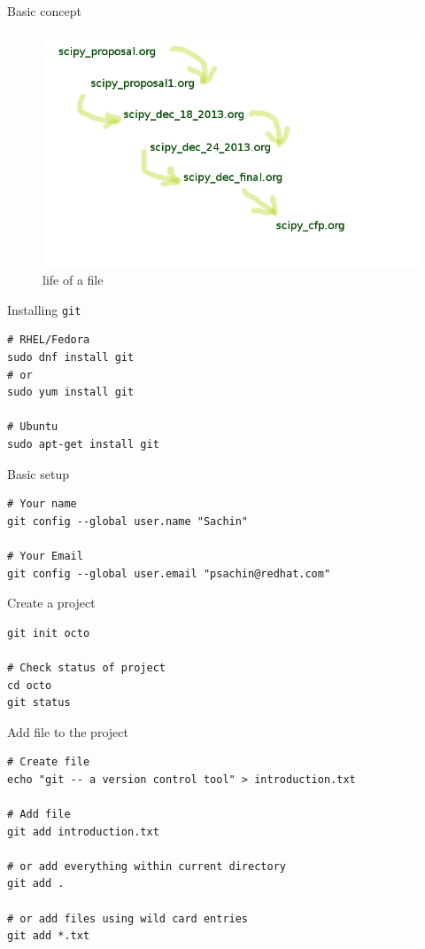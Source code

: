 \documentclass[10pt]{beamer}
\begin{document}
\begin{frame}[label={sec:org6343acc}]{Basic concept}
\begin{figure}[htbp]
\centering
\includegraphics[width=.9\linewidth]{./concept.png}
\caption{\label{fig:org6cfa832}
life of a file}
\end{figure}
\end{frame}

\begin{frame}[fragile,label={sec:org44d3edb}]{Installing \texttt{git}}
 \begin{verbatim}
# RHEL/Fedora
sudo dnf install git
# or
sudo yum install git

# Ubuntu
sudo apt-get install git
\end{verbatim}
\end{frame}


\begin{frame}[fragile,label={sec:org753a809}]{Basic setup}
 \begin{verbatim}
# Your name
git config --global user.name "Sachin"

# Your Email
git config --global user.email "psachin@redhat.com"
\end{verbatim}
\end{frame}


\begin{frame}[fragile,label={sec:org26537d0}]{Create a project}
 \begin{verbatim}
git init octo

# Check status of project
cd octo
git status
\end{verbatim}
\end{frame}

\begin{frame}[fragile,label={sec:orgb4439d0}]{Add file to the project}
 \begin{verbatim}
# Create file
echo "git -- a version control tool" > introduction.txt

# Add file
git add introduction.txt

# or add everything within current directory
git add .

# or add files using wild card entries
git add *.txt
\end{verbatim}
\end{frame}
\end{document}
